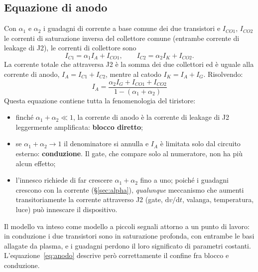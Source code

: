 \documentclass[11pt,a4paper]{article}
\newcommand{\IA}{\ensuremath{I_A}}
\newcommand{\IK}{\ensuremath{I_K}}
\newcommand{\IG}{\ensuremath{I_G}}
\newcommand{\dvdt}{\ensuremath{\mathrm{d}v/\mathrm{d}t}}
\begin{document}
\subsection{Equazione di anodo}
Con $\alpha_1$ e $\alpha_2$ i guadagni di corrente a base comune dei due transistori e $I_{CO1}$, $I_{CO2}$ le correnti di saturazione inversa del collettore comune (entrambe corrente di leakage di J2), le correnti di collettore sono
\begin{equation}
  I_{C1} = \alpha_1 \IA + I_{CO1}, \qquad I_{C2} = \alpha_2 \IK + I_{CO2}.
\end{equation}
La corrente totale che attraversa J2 è la somma dei due collettori ed è uguale alla corrente di anodo, $\IA = I_{C1}+I_{C2}$, mentre al catodo $\IK = \IA + \IG$. Risolvendo:
\begin{equation}
  \boxed{\;\IA = \frac{\alpha_2 \IG + I_{CO1} + I_{CO2}}{1 - (\alpha_1 + \alpha_2)}\;}
  \label{eq:anodo}
\end{equation}
Questa equazione contiene tutta la fenomenologia del tiristore:
\begin{itemize}
  \item finché $\alpha_1+\alpha_2 \ll 1$, la corrente di anodo è la corrente di leakage di J2 leggermente amplificata: \textbf{blocco diretto};
  \item se $\alpha_1+\alpha_2 \to 1$ il denominatore si annulla e $\IA$ è limitata solo dal circuito esterno: \textbf{conduzione}. Il gate, che compare solo al numeratore, non ha più alcun effetto;
  \item l'innesco richiede di far crescere $\alpha_1+\alpha_2$ fino a uno; poiché i guadagni crescono con la corrente (\S\ref{sec:alpha}), \emph{qualunque} meccanismo che aumenti transitoriamente la corrente attraverso J2 (gate, $\dvdt$, valanga, temperatura, luce) può innescare il dispositivo.
\end{itemize}

Il modello va inteso come modello a piccoli segnali attorno a un punto di lavoro: in conduzione i due transistori sono in saturazione profonda, con entrambe le basi allagate da plasma, e i guadagni perdono il loro significato di parametri costanti. L'equazione~\eqref{eq:anodo} descrive però correttamente il confine fra blocco e conduzione.
\end{document}
